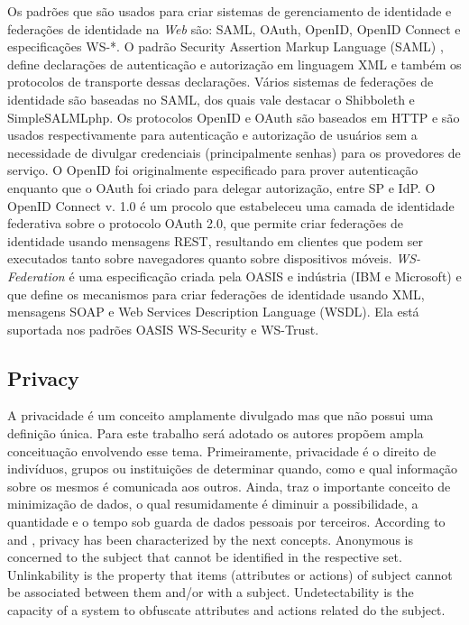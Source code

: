 \documentclass{doublecol-new}
\begin{document}
Os padrões que são usados para criar sistemas de gerenciamento de identidade e federações de identidade na \textit{Web} são:  SAML, OAuth, OpenID, OpenID Connect e especificações WS-*. O padrão Security Assertion Markup Language (SAML) \citep{ragouzis2008security}, define declarações de autenticação e autorização em linguagem XML e também os protocolos de transporte dessas declarações. Vários sistemas de federações de identidade são baseadas no SAML, dos quais vale destacar o Shibboleth \citep{erdos2002shibboleth} e SimpleSALMLphp. Os protocolos OpenID\citep{openid2015} e OAuth\citep{hardt2012oauth} são baseados em HTTP e são usados respectivamente para autenticação e autorização de usuários sem a necessidade de divulgar credenciais (principalmente senhas) para os provedores de serviço. O OpenID foi originalmente especificado para prover autenticação enquanto que o OAuth foi criado para delegar autorização, entre SP e IdP. O OpenID Connect v. 1.0 \citep{sakimura2014openidconnect} é um procolo que estabeleceu uma camada de identidade federativa sobre o protocolo OAuth 2.0, que permite criar federações de identidade usando mensagens REST, resultando em clientes que podem ser executados tanto sobre navegadores quanto sobre dispositivos móveis. \textit{WS-Federation} \citep{goodner2009ws} é uma especificação criada pela OASIS e indústria (IBM e Microsoft) e que define os mecanismos para criar federações de identidade usando XML, mensagens SOAP e Web Services Description Language (WSDL). Ela está suportada nos padrões OASIS WS-Security e WS-Trust.

\subsection[sec:privacy]{Privacy}

A privacidade é um conceito amplamente divulgado mas que não possui uma definição única. Para este trabalho será adotado os autores \cite{pfitzmann2010terminology} propõem ampla conceituação envolvendo esse tema. Primeiramente, privacidade é o direito de indivíduos, grupos ou instituições de determinar quando, como e qual informação sobre os mesmos é comunicada aos outros. Ainda, traz o importante conceito de minimização de dados, o qual resumidamente é diminuir a possibilidade, a quantidade e o tempo sob guarda de dados pessoais por terceiros. According to \cite{pfitzmann2010terminology} and  \cite{deng2011privacy}, privacy has been characterized by the next concepts. Anonymous is concerned to the subject that cannot be identified in the respective set. Unlinkability is the property that items (attributes or actions) of subject cannot be associated between them and/or with a subject. Undetectability is the capacity of a system to obfuscate attributes and actions related do the subject.
\end{document}
